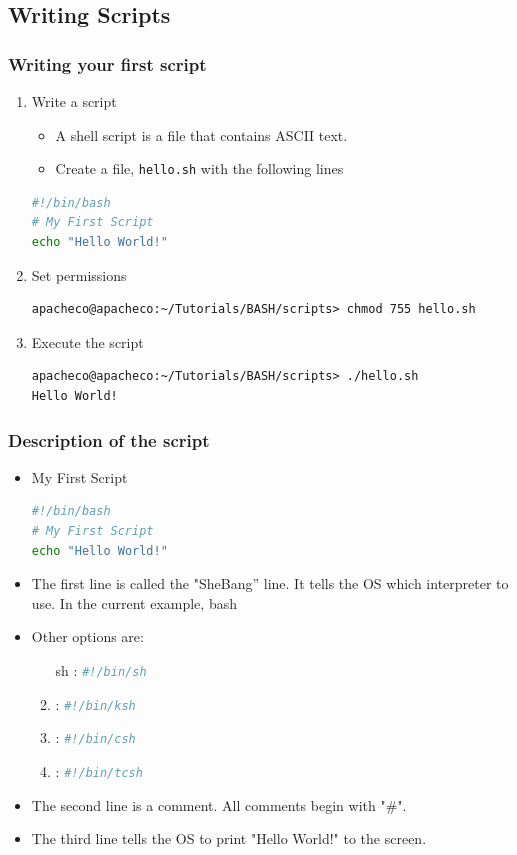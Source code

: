 \documentclass[10pt,t]{beamer}
\begin{document}
\subsection*{Writing Scripts}
\begin{frame}[fragile]
  \frametitle{Writing your first script}
  \begin{enumerate}
    \item Write a script
      \begin{itemize}
        \item A shell script is a file that contains ASCII text. 
        \item Create a file, \texttt{hello.sh} with the following lines 
      \end{itemize}
      \begin{lstlisting}[language=bash,basicstyle=\scriptsize\ttfamily]
#!/bin/bash
# My First Script
echo "Hello World!"
      \end{lstlisting}
    \item Set permissions
      \begin{Verbatim}[fontsize=\scriptsize,formatcom=\color{lupurple}]
apacheco@apacheco:~/Tutorials/BASH/scripts> chmod 755 hello.sh 
      \end{Verbatim}
    \item Execute the script
      \begin{Verbatim}[fontsize=\scriptsize,formatcom=\color{lupurple}]
apacheco@apacheco:~/Tutorials/BASH/scripts> ./hello.sh 
Hello World!
      \end{Verbatim}
  \end{enumerate}
\end{frame}

\begin{frame}[fragile]
  \frametitle{Description of the script}
  \begin{itemize}
    \item My First Script
      \begin{lstlisting}[language=bash]
#!/bin/bash
# My First Script
echo "Hello World!"
  \end{lstlisting}
    \item The first line is called the "SheBang'' line. It tells the OS which interpreter to use. In the current example, bash
    \item Other options are:
    \begin{enumerate}
        \item[sh]   : \lstinline[language=bash]|#!/bin/sh|
        \item[ksh]  : \lstinline[language=bash]|#!/bin/ksh|
        \item[csh]  : \lstinline[language=csh]|#!/bin/csh|
        \item[tcsh] : \lstinline[language=csh]|#!/bin/tcsh|
    \end{enumerate}
    \item The second line is a comment. All comments begin with "\#".
    \item The third line tells the OS to print "Hello World!" to the screen.
  \end{itemize}
\end{frame}
\end{document}

